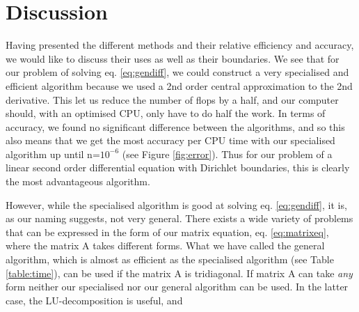 \section{Discussion}
\label{sec:discussion}

Having presented the different methods and their relative efficiency and
accuracy, we would like to discuss their uses as well as their boundaries.
We see that for our problem of solving eq. \ref{eq:gendiff}, we could construct
a very specialised and efficient algorithm because we used a 2nd order
central approximation to the 2nd derivative. This let us reduce the number of
flops by a half, and our computer should, with an optimised CPU, only have to do
half the work. In terms of accuracy, we found no significant difference between
the algorithms, and so this also means that we get the most accuracy per CPU time
with our specialised algorithm up until n=$10^{-6}$ (see Figure \ref{fig:error}).
Thus for our problem of a linear second order differential equation with
Dirichlet boundaries, this is clearly the most advantageous algorithm.

However, while the specialised algorithm is good at solving eq. \ref{eq:gendiff},
it is, as our naming suggests, not very general. There exists a wide variety of
problems that can be expressed in the form of our matrix equation, eq.
\ref{eq:matrixeq}, where the matrix A takes different forms. What we have called the general algorithm, which is almost as efficient as the specialised algorithm (see Table \ref{table:time}), can be used if the matrix A is tridiagonal. If matrix A can take \textit{any} form neither our specialised nor our general algorithm can be used.
In the latter case, the LU-decomposition is useful, and 
